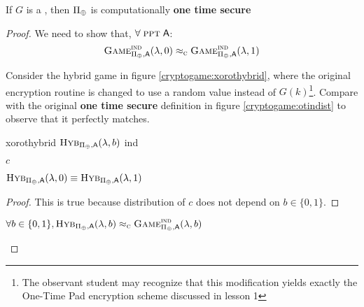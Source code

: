 \begin{theorem}
    If $G$ is a \prg, then $\Pi_{\oplus}$ is computationally \textbf{one time secure}
\end{theorem}

\begin{proof}
    We need to show that, $\forall\; \textsc{ppt}\; \textsf{A}$:
    \[
        \textsc{Game}_{\Pi_{\oplus}, \textsf{A}}^{\textsc{ind}}(\lambda, 0) \approx_\textsc{c} \textsc{Game}_{\Pi_{\oplus}, \textsf{A}}^{\textsc{ind}}(\lambda, 1)
    \]

    Consider the hybrid game in figure \ref{cryptogame:xorothybrid}, where the original encryption routine is changed to use a random value instead of $G(k)$\footnote{The observant student may recognize that this modification yields exactly the One-Time Pad encryption scheme discussed in lesson 1}. Compare with the original \textbf{one time secure} definition in figure \ref{cryptogame:otindist} to observe that it perfectly matches.

    \begin{cryptogame}
        {xorothybrid}
        {$\textsc{Hyb}_{\Pi_{\oplus}, \textsf{A}}(\lambda, b)$}
        {ind}


        {$c$}{}

        \cseqdelay

        
    \end{cryptogame}

    \begin{lemma}
        \emph{\textrm{$\textsc{Hyb}_{\Pi_{\oplus}, \textsf{A}}(\lambda, 0) \equiv \textsc{Hyb}_{\Pi_{\oplus}, \textsf{A}}(\lambda, 1)$}}
    \end{lemma}

    \begin{proof}
    This is true because distribution of $c$ does not depend on $b \in \{0, 1\}$.
    \end{proof}

    \begin{lemma}
        $ \forall b \in \{0,1\}, \textsc{Hyb}_{\Pi_{\oplus}, \textsf{A}}(\lambda, b) \approx_\textsc{c} \textsc{Game}_{\Pi_{\oplus}, \textsf{A}}^{\textsc{ind}}(\lambda, b)$
    \end{lemma}


\end{proof}
